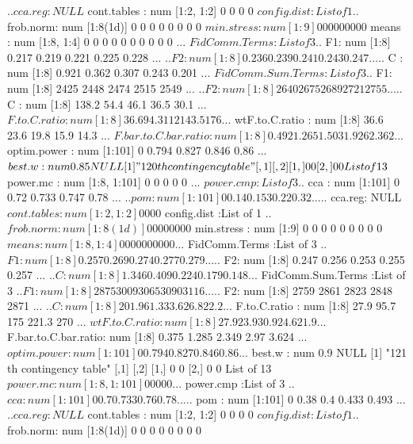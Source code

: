 \documentclass[11pt]{article} %
\begin{document}
\begin{Schunk}
\begin{Soutput}
  ..$ cca.reg: NULL
 $ cont.tables         : num [1:2, 1:2] 0 0 0 0
 $ config.dist         :List of 1
  ..$ frob.norm: num [1:8(1d)] 0 0 0 0 0 0 0 0
 $ min.stress          : num [1:9] 0 0 0 0 0 0 0 0 0
 $ means               : num [1:8, 1:4] 0 0 0 0 0 0 0 0 0 0 ...
 $ FidComm.Terms       :List of 3
  ..$ F1: num [1:8] 0.217 0.219 0.221 0.225 0.228 ...
  ..$ F2: num [1:8] 0.236 0.239 0.241 0.243 0.247 ...
  ..$ C : num [1:8] 0.921 0.362 0.307 0.243 0.201 ...
 $ FidComm.Sum.Terms   :List of 3
  ..$ F1: num [1:8] 2425 2448 2474 2515 2549 ...
  ..$ F2: num [1:8] 2640 2675 2689 2721 2755 ...
  ..$ C : num [1:8] 138.2 54.4 46.1 36.5 30.1 ...
 $ F.to.C.ratio        : num [1:8] 36.6 94.3 112 143.5 176 ...
 $ wtF.to.C.ratio      : num [1:8] 36.6 23.6 19.8 15.9 14.3 ...
 $ F.bar.to.C.bar.ratio: num [1:8] 0.492 1.265 1.503 1.926 2.362 ...
 $ optim.power         : num [1:101] 0 0.794 0.827 0.846 0.86 ...
 $ best.w              : num 0.85
NULL
[1] "120 th contingency table"
     [,1] [,2]
[1,]    0    0
[2,]    0    0
List of 13
 $ power.mc            : num [1:8, 1:101] 0 0 0 0 0 ...
 $ power.cmp           :List of 3
  ..$ cca    : num [1:101] 0 0.72 0.733 0.747 0.78 ...
  ..$ pom    : num [1:101] 0 0.14 0.153 0.22 0.32 ...
  ..$ cca.reg: NULL
 $ cont.tables         : num [1:2, 1:2] 0 0 0 0
 $ config.dist         :List of 1
  ..$ frob.norm: num [1:8(1d)] 0 0 0 0 0 0 0 0
 $ min.stress          : num [1:9] 0 0 0 0 0 0 0 0 0
 $ means               : num [1:8, 1:4] 0 0 0 0 0 0 0 0 0 0 ...
 $ FidComm.Terms       :List of 3
  ..$ F1: num [1:8] 0.257 0.269 0.274 0.277 0.279 ...
  ..$ F2: num [1:8] 0.247 0.256 0.253 0.255 0.257 ...
  ..$ C : num [1:8] 1.346 0.409 0.224 0.179 0.148 ...
 $ FidComm.Sum.Terms   :List of 3
  ..$ F1: num [1:8] 2875 3009 3065 3090 3116 ...
  ..$ F2: num [1:8] 2759 2861 2823 2848 2871 ...
  ..$ C : num [1:8] 201.9 61.3 33.6 26.8 22.2 ...
 $ F.to.C.ratio        : num [1:8] 27.9 95.7 175 221.3 270 ...
 $ wtF.to.C.ratio      : num [1:8] 27.9 23.9 30.9 24.6 21.9 ...
 $ F.bar.to.C.bar.ratio: num [1:8] 0.375 1.285 2.349 2.97 3.624 ...
 $ optim.power         : num [1:101] 0 0.794 0.827 0.846 0.86 ...
 $ best.w              : num 0.9
NULL
[1] "121 th contingency table"
     [,1] [,2]
[1,]    0    0
[2,]    0    0
List of 13
 $ power.mc            : num [1:8, 1:101] 0 0 0 0 0 ...
 $ power.cmp           :List of 3
  ..$ cca    : num [1:101] 0 0.7 0.733 0.76 0.78 ...
  ..$ pom    : num [1:101] 0 0.38 0.4 0.433 0.493 ...
  ..$ cca.reg: NULL
 $ cont.tables         : num [1:2, 1:2] 0 0 0 0
 $ config.dist         :List of 1
  ..$ frob.norm: num [1:8(1d)] 0 0 0 0 0 0 0 0

\end{Soutput}
\end{Schunk}
\end{document}
